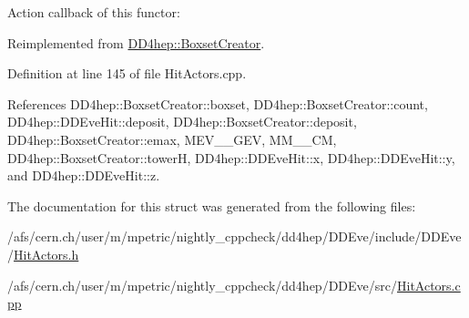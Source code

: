 Action callback of this functor\+: 



Reimplemented from \hyperlink{struct_d_d4hep_1_1_boxset_creator_a25f63197d03ad33193ac3c77207db808}{D\+D4hep\+::\+Boxset\+Creator}.



Definition at line 145 of file Hit\+Actors.\+cpp.



References D\+D4hep\+::\+Boxset\+Creator\+::boxset, D\+D4hep\+::\+Boxset\+Creator\+::count, D\+D4hep\+::\+D\+D\+Eve\+Hit\+::deposit, D\+D4hep\+::\+Boxset\+Creator\+::deposit, D\+D4hep\+::\+Boxset\+Creator\+::emax, M\+E\+V\+\_\+\_\+\+G\+EV, M\+M\+\_\+\_\+\+CM, D\+D4hep\+::\+Boxset\+Creator\+::towerH, D\+D4hep\+::\+D\+D\+Eve\+Hit\+::x, D\+D4hep\+::\+D\+D\+Eve\+Hit\+::y, and D\+D4hep\+::\+D\+D\+Eve\+Hit\+::z.



The documentation for this struct was generated from the following files\+:\begin{DoxyCompactItemize}
\item 
/afs/cern.\+ch/user/m/mpetric/nightly\+\_\+cppcheck/dd4hep/\+D\+D\+Eve/include/\+D\+D\+Eve/\hyperlink{_hit_actors_8h}{Hit\+Actors.\+h}\item 
/afs/cern.\+ch/user/m/mpetric/nightly\+\_\+cppcheck/dd4hep/\+D\+D\+Eve/src/\hyperlink{_hit_actors_8cpp}{Hit\+Actors.\+cpp}\end{DoxyCompactItemize}
